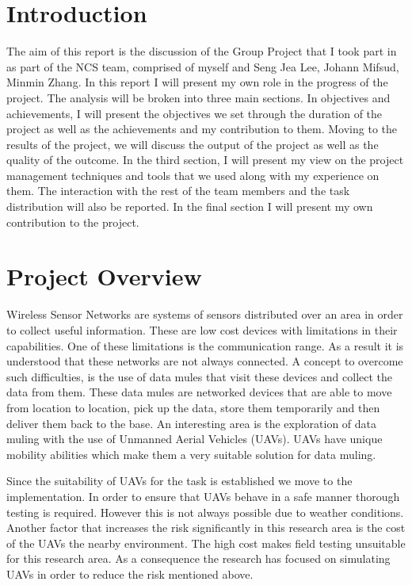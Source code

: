 





\tableofcontents{}

\pagebreak

\section{Introduction}
The aim of this report is the discussion of the Group Project that I took part
in as part of the NCS team, comprised of myself and Seng Jea Lee, Johann Mifsud,
Minmin Zhang. In this report I will present my own role in the progress of
the project. The analysis will be broken into three main sections. In objectives
and achievements, I will present the objectives we set through the duration of
the project as well as the achievements and my contribution to them. Moving to
the results of the project, we will discuss the output of the project as well as
the quality of the outcome. In the third section, I will present my view on the
project management techniques and tools that we used along with my experience on
them. The interaction with the rest of the team members and the task
distribution will also be reported. In the final section I will present my own
contribution to the project.

\section{Project Overview}
Wireless Sensor Networks are systems of sensors distributed over an area in
order to collect useful information. These are low cost devices with limitations
in their capabilities. One of these limitations is the communication range. As a
result it is understood that these networks are not always connected. A concept
to overcome such difficulties, is the use of data mules that visit these devices
and collect the data from them. These data mules are networked devices that are
able to move from location to location, pick up the data, store them
temporarily and then deliver them back to the base. An interesting area is the
exploration of data muling with the use of Unmanned Aerial Vehicles (UAVs).
UAVs have unique mobility abilities which make them a very suitable solution
for data muling.

Since the suitability of UAVs for the task is established we move to the
implementation. In order to ensure that UAVs behave in a safe manner thorough
testing is required. However this is not always possible due to weather
conditions. Another factor that increases the risk significantly in this
research area is the cost of the UAVs the nearby environment. The high cost
makes field testing unsuitable for this research area. As a consequence the
research has focused on simulating UAVs in order to reduce the risk mentioned
above.

